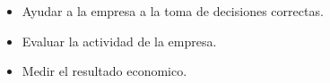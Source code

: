 \begin{itemize}
\item Ayudar a la empresa a la toma de decisiones correctas.\\
\item Evaluar la actividad de la empresa.\\
\item Medir el resultado economico.\\
\end{itemize}
